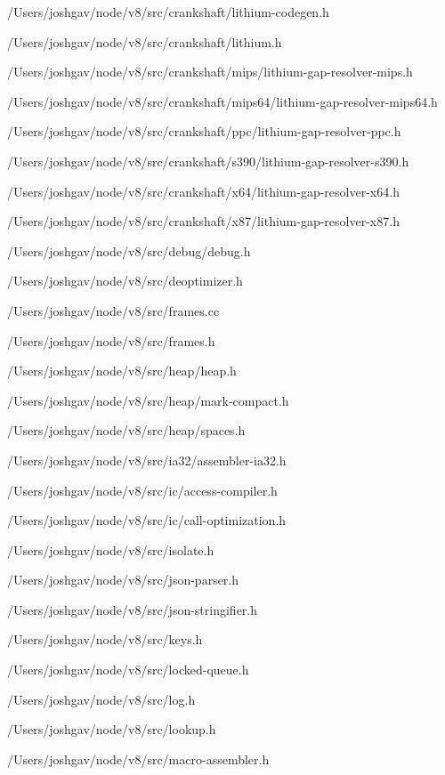 \begin{DoxyCompactItemize}
/\+Users/joshgav/node/v8/src/crankshaft/lithium-\/codegen.\+h\item 
/\+Users/joshgav/node/v8/src/crankshaft/lithium.\+h\item 
/\+Users/joshgav/node/v8/src/crankshaft/mips/lithium-\/gap-\/resolver-\/mips.\+h\item 
/\+Users/joshgav/node/v8/src/crankshaft/mips64/lithium-\/gap-\/resolver-\/mips64.\+h\item 
/\+Users/joshgav/node/v8/src/crankshaft/ppc/lithium-\/gap-\/resolver-\/ppc.\+h\item 
/\+Users/joshgav/node/v8/src/crankshaft/s390/lithium-\/gap-\/resolver-\/s390.\+h\item 
/\+Users/joshgav/node/v8/src/crankshaft/x64/lithium-\/gap-\/resolver-\/x64.\+h\item 
/\+Users/joshgav/node/v8/src/crankshaft/x87/lithium-\/gap-\/resolver-\/x87.\+h\item 
/\+Users/joshgav/node/v8/src/debug/debug.\+h\item 
/\+Users/joshgav/node/v8/src/deoptimizer.\+h\item 
/\+Users/joshgav/node/v8/src/frames.\+cc\item 
/\+Users/joshgav/node/v8/src/frames.\+h\item 
/\+Users/joshgav/node/v8/src/heap/heap.\+h\item 
/\+Users/joshgav/node/v8/src/heap/mark-\/compact.\+h\item 
/\+Users/joshgav/node/v8/src/heap/spaces.\+h\item 
/\+Users/joshgav/node/v8/src/ia32/assembler-\/ia32.\+h\item 
/\+Users/joshgav/node/v8/src/ic/access-\/compiler.\+h\item 
/\+Users/joshgav/node/v8/src/ic/call-\/optimization.\+h\item 
/\+Users/joshgav/node/v8/src/isolate.\+h\item 
/\+Users/joshgav/node/v8/src/json-\/parser.\+h\item 
/\+Users/joshgav/node/v8/src/json-\/stringifier.\+h\item 
/\+Users/joshgav/node/v8/src/keys.\+h\item 
/\+Users/joshgav/node/v8/src/locked-\/queue.\+h\item 
/\+Users/joshgav/node/v8/src/log.\+h\item 
/\+Users/joshgav/node/v8/src/lookup.\+h\item 
/\+Users/joshgav/node/v8/src/macro-\/assembler.\+h\item 

\end{DoxyCompactItemize}
